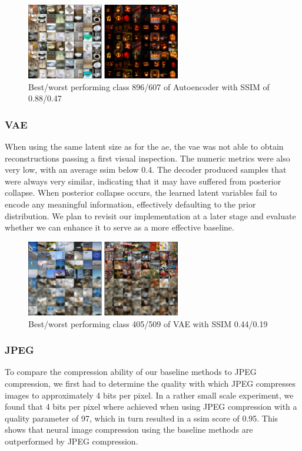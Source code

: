 \begin{figure}[H]
    \centering
    \includegraphics[width=0.6\textwidth]{images/ae_minmax}
    \caption{Best/worst performing class 896/607 of Autoencoder with SSIM of 0.88/0.47}
    \label{fig:imnet_best_perf_ae}
\end{figure}

\subsubsection{VAE}
When using the same latent size as for the \ac{ae}, the \ac{vae} was not able to obtain reconstructions
passing a first visual inspection.
The numeric metrics were also very low, with an average \ac{ssim} below 0.4.
The decoder produced samples that were always very similar, indicating that it may have suffered from posterior
collapse.
When posterior collapse occurs, the learned latent variables fail to encode any meaningful information, effectively
defaulting to the prior distribution.
We plan to revisit our implementation at a later stage and evaluate whether we can enhance it to serve as a more effective baseline.

\begin{figure}[H]
    \centering
    \includegraphics[width=0.6\textwidth]{images/vae_minmax}
    \caption{Best/worst performing class 405/509 of VAE with SSIM 0.44/0.19}
    \label{fig:imnet_best_perf2_vae}
\end{figure}

\subsubsection{JPEG}\label{subsubsec:jpeg}
To compare the compression ability of our baseline methods to JPEG compression, we first had to determine the quality with which JPEG compresses images to approximately 4 bits per pixel.
In a rather small scale experiment, we found that 4 bits per pixel where achieved when using JPEG compression with a quality parameter of 97, which in turn resulted in a \ac{ssim} score of 0.95.
This shows that neural image compression using the baseline methods are outperformed by JPEG compression.

